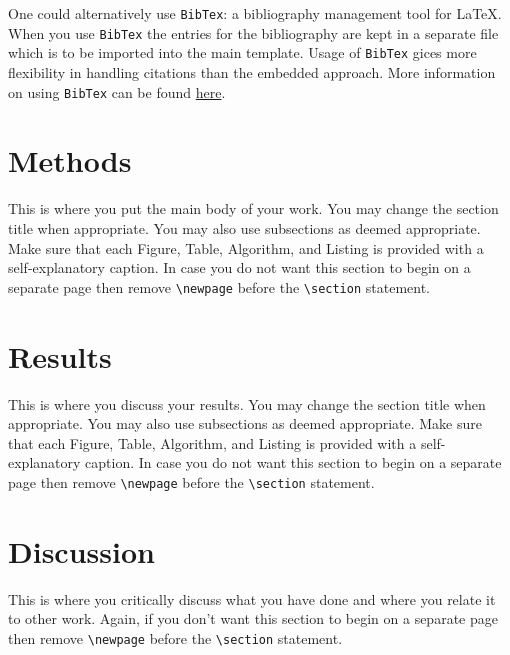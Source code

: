 \documentclass{amsart}
\theoremstyle{plain}
\begin{document}
One could alternatively use \texttt{BibTex}: a bibliography management tool for \LaTeX.
When you use \texttt{BibTex} the entries for the bibliography are kept in a separate file which is to be imported into the main template.
Usage of \texttt{BibTex} gices more flexibility in handling citations than the embedded approach.
More information on using \texttt{BibTex} can be found \href{https://www.overleaf.com/learn/latex/Bibliography_management_with_bibtex}{here}.





\newpage
\section{Methods}
This is where you put the main body of your work.
You may change the section title when appropriate.
You may also use subsections as deemed appropriate.
Make sure that each Figure, Table, Algorithm, and Listing is provided with a self-explanatory caption.
In case you do not want this section to begin on a separate page then remove \verb|\newpage| before the \verb|\section| statement.



\newpage
\section{Results}
This is where you discuss your results.
You may change the section title when appropriate.
You may also use subsections as deemed appropriate.
Make sure that each Figure, Table, Algorithm, and Listing is provided with a self-explanatory caption.
In case you do not want this section to begin on a separate page then remove \verb|\newpage| before the \verb|\section| statement.



\newpage
\section{Discussion}
This is where you critically discuss what you have done and where you relate it to other work.
Again, if you don't want this section to begin on a separate page then remove \verb|\newpage| before the \verb|\section| statement.
\end{document}

